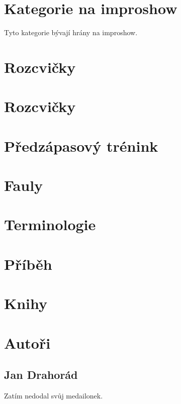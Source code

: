 \documentclass[a4paper,10pt,openany]{book}
\begin{document}
\chapter{Kategorie na improshow}\label{další kategorie}
\label{:kategorie:kategorie na improshow}
Tyto kategorie bývají hrány na improshow.


\chapter{Rozcvičky}\label{rozcvičky}



\chapter{Rozcvičky}\label{rozcvičky}





\chapter{Předzápasový trénink}\label{předzápasový trénink}


\chapter{Fauly}\label{fauly}



\chapter{Terminologie}\label{terminologie}
\label{:kategorie:terminologie}


\chapter{Příběh}\label{příběh}



\chapter{Knihy}\label{knihy}



\chapter{Autoři}\label{autori}
\section{Jan Drahorád}
Zatím nedodal svůj medailonek.
\end{document}
